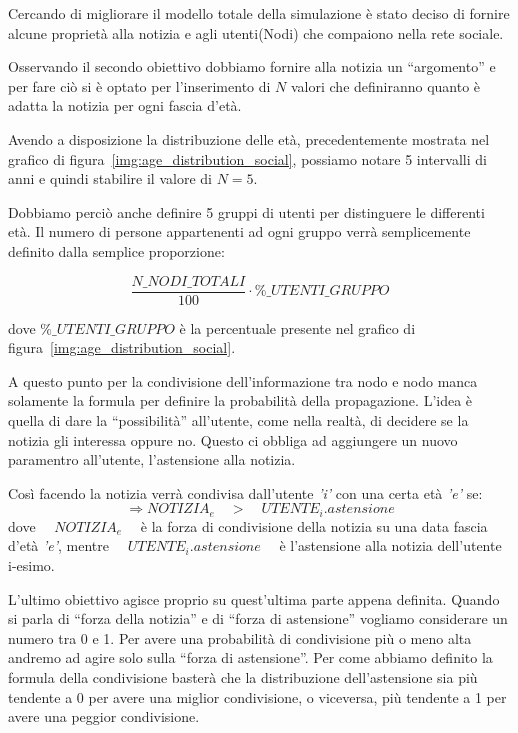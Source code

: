 Cercando di migliorare il modello totale della simulazione è stato deciso di fornire alcune proprietà alla notizia e 
agli utenti(Nodi) che compaiono nella rete sociale.

Osservando il secondo obiettivo dobbiamo fornire alla notizia un ``argomento'' e per fare ciò si 
è optato per l'inserimento di $N$ valori che definiranno quanto è adatta la notizia per ogni fascia d'età.

Avendo a disposizione la distribuzione delle età, precedentemente mostrata nel grafico di figura~\ref{img:age_distribution_social},
possiamo notare 5 intervalli di anni e quindi stabilire il valore di $N = 5$.

Dobbiamo perciò anche definire 5 gruppi di utenti per distinguere le differenti età.
Il numero di persone appartenenti ad ogni gruppo verrà semplicemente definito dalla semplice proporzione:

\[
\frac{N\_NODI\_TOTALI}{100} \cdot \%\_UTENTI\_GRUPPO
\]

dove $\%\_UTENTI\_GRUPPO$ è la percentuale presente nel grafico di figura~\ref{img:age_distribution_social}.

A questo punto per la condivisione dell'informazione tra nodo e nodo manca solamente la formula per definire la probabilità 
della propagazione.
L'idea è quella di dare la ``possibilità'' all'utente, come nella realtà, di decidere se la 
notizia gli interessa oppure no. 
Questo ci obbliga ad aggiungere un nuovo paramentro all'utente, l'astensione alla notizia.

Così facendo la notizia verrà condivisa dall'utente \emph{'i'} con una certa età \emph{'e'} se:
\begin{equation*}
\Rightarrow NOTIZIA_e \quad > \quad UTENTE_i.astensione
\end{equation*}
dove $\quad NOTIZIA_e \quad$ è la forza di condivisione della notizia su una data fascia d'età \emph{'e'}, 
mentre $\quad UTENTE_i.astensione \quad$ è l'astensione alla notizia dell'utente i-esimo.

L'ultimo obiettivo agisce proprio su quest'ultima parte appena definita.
Quando si parla di ``forza della notizia'' e di ``forza di astensione'' vogliamo considerare un numero tra 0 e 1.
Per avere una probabilità di condivisione più o meno alta andremo ad agire solo sulla ``forza di astensione''.
Per come abbiamo definito la formula della condivisione basterà che la distribuzione dell'astensione sia più 
tendente a 0 per avere una miglior condivisione, o viceversa, più tendente a 1 per avere una peggior
condivisione.

